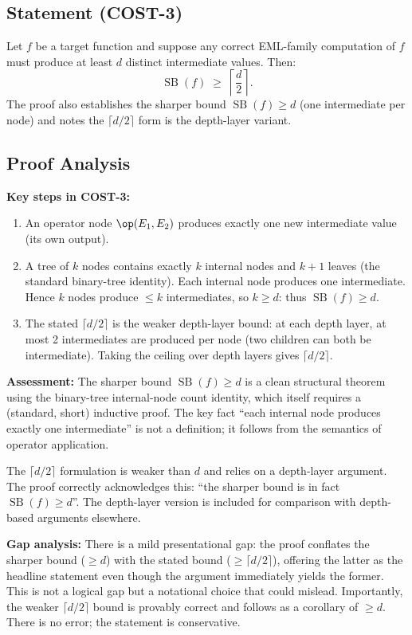 \documentclass[12pt,a4paper]{article}
\theoremstyle{definition}
\newcommand{\SB}{\operatorname{SB}}
\begin{document}
\subsection{Statement (COST-3)}

Let $f$ be a target function and suppose any correct EML-family computation of
$f$ must produce at least $d$ distinct intermediate values.  Then:
\[
  \SB(f) \;\geq\; \left\lceil \frac{d}{2} \right\rceil.
\]
The proof also establishes the sharper bound $\SB(f) \geq d$ (one intermediate
per node) and notes the $\lceil d/2 \rceil$ form is the depth-layer variant.

\subsection{Proof Analysis}

\textbf{Key steps in COST-3:}
\begin{enumerate}
  \item An operator node $\op(E_1, E_2)$ produces exactly one new intermediate
        value (its own output).
  \item A tree of $k$ nodes contains exactly $k$ internal nodes and $k+1$
        leaves (the standard binary-tree identity).  Each internal node
        produces one intermediate.  Hence $k$ nodes produce $\leq k$
        intermediates, so $k \geq d$: thus $\SB(f) \geq d$.
  \item The stated $\lceil d/2 \rceil$ is the weaker depth-layer bound: at each
        depth layer, at most 2 intermediates are produced per node (two children
        can both be intermediate).  Taking the ceiling over depth layers gives
        $\lceil d/2 \rceil$.
\end{enumerate}

\textbf{Assessment:}  The sharper bound $\SB(f) \geq d$ is a clean structural
theorem using the binary-tree internal-node count identity, which itself
requires a (standard, short) inductive proof.  The key fact ``each internal
node produces exactly one intermediate'' is not a definition; it follows from
the semantics of operator application.

The $\lceil d/2 \rceil$ formulation is weaker than $d$ and relies on a
depth-layer argument.  The proof correctly acknowledges this: ``the sharper
bound is in fact $\SB(f) \geq d$''.  The depth-layer version is included for
comparison with depth-based arguments elsewhere.

\textbf{Gap analysis:}  There is a mild presentational gap: the proof
conflates the sharper bound ($\geq d$) with the stated bound ($\geq \lceil d/2
\rceil$), offering the latter as the headline statement even though the
argument immediately yields the former.  This is not a logical gap but a
notational choice that could mislead.  Importantly, the weaker $\lceil d/2
\rceil$ bound is provably correct and follows as a corollary of $\geq d$.
There is no error; the statement is conservative.
\end{document}
